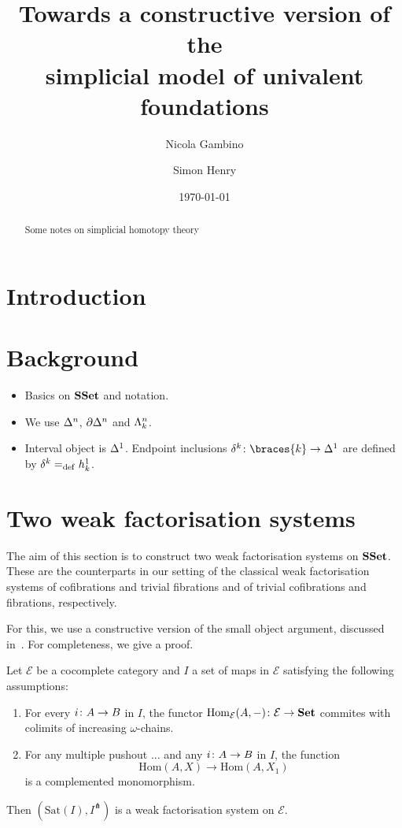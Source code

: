 \documentclass[reqno,10pt,a4paper,oneside,draft]{amsart}
\title[]{Towards a constructive version of the \\ simplicial model of univalent foundations}
\begin{document}
\begin{abstract}
Some notes on simplicial homotopy theory
\end{abstract}

\author{Nicola Gambino}

\author{Simon Henry}


 \date{\today}

\maketitle

\section{Introduction}

\newpage


\section{Background}


\begin{itemize}
\item Basics on $\SSet$ and notation. 
\item We use $\Delt{n}$, $\partial \Delt{n}$ and $\Horn{k}{n}$.
\item Interval object is $\Delt{1}$. Endpoint inclusions $\kcyl \co \braces{ k} \to \Delt{1}$ are
defined by $\kcyl \defeq \horninc{1}{k}$.
\end{itemize}


\section{Two weak factorisation systems} 

The aim of this section is to construct two weak factorisation systems on $\SSet$. These are the counterparts in our setting of the classical weak factorisation systems of cofibrations and trivial fibrations and of trivial cofibrations and fibrations, respectively. 

For this, we use a constructive version of the small object argument, discussed in~\cite{henry2018wms}. For completeness, we give a proof. 

\begin{lemma} \label{thm:soa} Let $\mathcal{E}$ be a cocomplete category and $I$ a set of maps in $\mathcal{E}$ satisfying the following assumptions:
\begin{enumerate}[$(i)$]
\item For every $i \co A \to B$ in $I$, the functor $\mathrm{Hom}_\mathcal{E}(A, -) \co \mathcal{E} \to
\mathbf{Set}$ commites with colimits of increasing $\omega$-chains.
\item For any multiple pushout ... and any $i \co A \to B$ in $I$, the function
\[
\mathrm{Hom}(A, X) \to \mathrm{Hom}(A, X_1)
\]
is a complemented monomorphism.
\end{enumerate}
Then $(\mathrm{Sat}(I), I^\pitchfork)$ is a weak factorisation system on $\mathcal{E}$.
\end{lemma}
\end{document}
